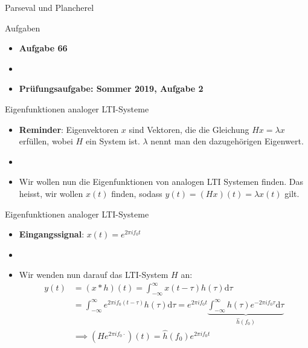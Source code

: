 \documentclass[14pt, aspectratio=169, handout]{beamer}
\begin{document}
\begin{frame}{Parseval und Plancherel}
\end{frame}

\begin{frame}{Aufgaben}
    \begin{itemize}
        \item \textbf{Aufgabe 66}
        \item[] 
        \item \textbf{Prüfungsaufgabe: Sommer 2019, Aufgabe 2}
    \end{itemize}
\end{frame}

\begin{frame}{Eigenfunktionen analoger LTI-Systeme}
    \begin{itemize}
        \item \textbf{Reminder}: Eigenvektoren $x$ sind Vektoren, die die Gleichung $Hx = \lambda x$ erfüllen, wobei $H$ ein System ist. $\lambda$ nennt man den dazugehörigen Eigenwert.
        \item[] 
        \item Wir wollen nun die Eigenfunktionen von analogen LTI Systemen finden. Das heisst, wir wollen $x(t)$ finden, sodass $y(t) = (Hx)(t) = \lambda x(t)$ gilt.
    \end{itemize}
\end{frame}

\begin{frame}{Eigenfunktionen analoger LTI-Systeme}
    \begin{itemize}
        \item \textbf{Eingangssignal}: $x(t)= e^{2\pi i f_0 t}$
        \item[] 
        \item[] Wir wenden nun darauf das LTI-System $H$ an:
        \begin{align*}
            y(t) &= (x \ast h)(t) = \int_{-\infty}^\infty x(t-\tau)h(\tau) \text{d}\tau \\
            &=\int_{-\infty}^\infty e^{2 \pi i f_0 (t-\tau)} h(\tau) \text{d}\tau = e^{2 \pi i f_0 t} \underbrace{\int_{-\infty}^\infty h(\tau) e^{-2\pi i f_0 \tau} \text{d}\tau}_{\hat{h}(f_0)} \\
            &\implies (He^{2 \pi i f_0 \cdot})(t) = \hat{h}(f_0)e^{2 \pi i f_0 t}
        \end{align*}
    \end{itemize}
\end{frame}
\end{document}
